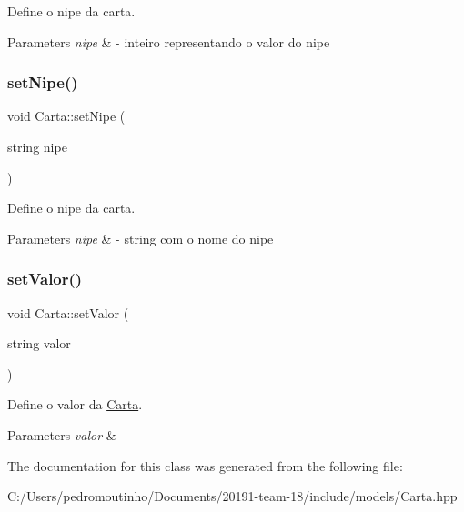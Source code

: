 Define o nipe da carta. 


\begin{DoxyParams}{Parameters}
{\em nipe} & -\/ inteiro representando o valor do nipe \\
\hline
\end{DoxyParams}
\mbox{\label{class_carta_a770fd5ddbf8d3378a0179420ced840e0}} 
\subsubsection{\texorpdfstring{setNipe()}{setNipe()}\hspace{0.1cm}{\footnotesize\ttfamily [2/2]}}
{\footnotesize\ttfamily void Carta\+::set\+Nipe (\begin{DoxyParamCaption}\item[{string}]{nipe }\end{DoxyParamCaption})}



Define o nipe da carta. 


\begin{DoxyParams}{Parameters}
{\em nipe} & -\/ string com o nome do nipe \\
\hline
\end{DoxyParams}
\mbox{\label{class_carta_a66b728786354a62104ef2475b5376fea}} 
\subsubsection{\texorpdfstring{setValor()}{setValor()}}
{\footnotesize\ttfamily void Carta\+::set\+Valor (\begin{DoxyParamCaption}\item[{string}]{valor }\end{DoxyParamCaption})}



Define o valor da \mbox{\hyperlink{class_carta}{Carta}}. 


\begin{DoxyParams}{Parameters}
{\em valor} & \\
\hline
\end{DoxyParams}


The documentation for this class was generated from the following file\+:\begin{DoxyCompactItemize}
\item 
C\+:/\+Users/pedromoutinho/\+Documents/20191-\/team-\/18/include/models/Carta.\+hpp\end{DoxyCompactItemize}
